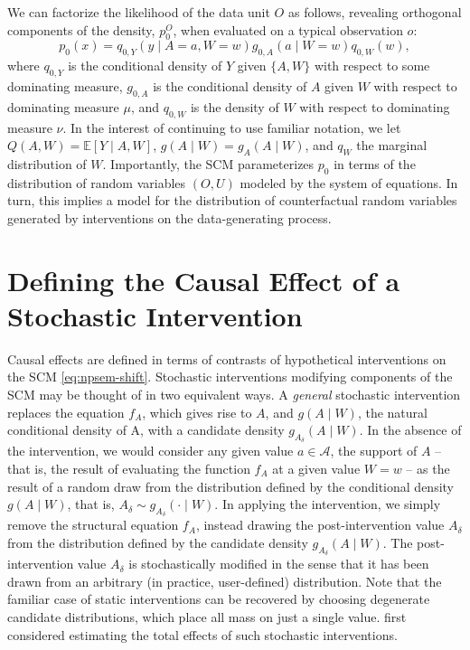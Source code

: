 \documentclass[
  12pt, krantz2,
]{krantz}
\newcommand{\E}{\mathbb{E}}
\newcommand{\1}{\mathbbm{1}}
\theoremstyle{definition}
\theoremstyle{definition}
\theoremstyle{definition}
\theoremstyle{definition}
\theoremstyle{remark}
\begin{document}
We can factorize the likelihood of the data unit \(O\) as follows, revealing
orthogonal components of the density, \(p_0^O\), when evaluated on a typical
observation \(o\):
\begin{equation}
  p_0(x) = q_{0,Y}(y \mid A = a, W = w) g_{0,A}(a \mid W = w) q_{0,W}(w),
  \label{eq:likelihood-factorization-shift}
\end{equation}
where \(q_{0, Y}\) is the conditional density of \(Y\) given \(\{A, W\}\) with respect
to some dominating measure, \(g_{0, A}\) is the conditional density of \(A\) given
\(W\) with respect to dominating measure \(\mu\), and \(q_{0, W}\) is the density of
\(W\) with respect to dominating measure \(\nu\). In the interest of continuing to
use familiar notation, we let \(Q(A, W) = \E[Y \mid A, W]\), \(g(A \mid W) = g_{A}(A \mid W)\), and \(q_W\) the marginal distribution of \(W\). Importantly, the
SCM parameterizes \(p_0\) in terms of the distribution of random variables \((O, U)\) modeled by the system of equations. In turn, this implies a model for the
distribution of counterfactual random variables generated by interventions on
the data-generating process.

\hypertarget{defining-the-causal-effect-of-a-stochastic-intervention}{%
\section{Defining the Causal Effect of a Stochastic Intervention}\label{defining-the-causal-effect-of-a-stochastic-intervention}}

Causal effects are defined in terms of contrasts of hypothetical interventions
on the SCM \eqref{eq:npsem-shift}. Stochastic interventions modifying
components of the SCM may be thought of in two equivalent ways. A \emph{general}
stochastic intervention replaces the equation \(f_A\), which gives rise to \(A\),
and \(g(A \mid W)\), the natural conditional density of A, with a candidate
density \(g_{A_{\delta}}(A \mid W)\). In the absence of the intervention, we would
consider any given value \(a \in \mathcal{A}\), the support of \(A\) -- that is, the
result of evaluating the function \(f_A\) at a given value \(W = w\) -- as the
result of a random draw from the distribution defined by the conditional density
\(g(A \mid W)\), that is, \(A_{\delta} \sim g_{A_{\delta}}(\cdot \mid W)\). In
applying the intervention, we simply remove the structural equation \(f_A\),
instead drawing the post-intervention value \(A_{\delta}\) from the distribution
defined by the candidate density \(g_{A_{\delta}}(A \mid W)\). The
post-intervention value \(A_{\delta}\) is stochastically modified in the sense
that it has been drawn from an arbitrary (in practice, user-defined)
distribution. Note that the familiar case of static interventions can be
recovered by choosing degenerate candidate distributions, which place all mass
on just a single value. \citet{stock1989nonparametric} first considered estimating the
total effects of such stochastic interventions.
\end{document}
